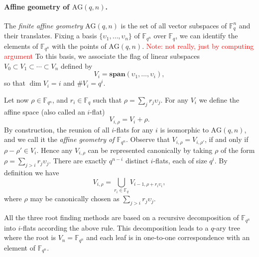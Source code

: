 \documentclass{article}
\newcommand{\ff}[1]{\mathbb{F}_{#1}}
\newcommand{\fq}{\ff{q}}
\newcommand{\qq}{q}
\newcommand{\nn}{n}
\newcommand{\qn}{{\qq^\nn}}
\newcommand{\basef}{\ff{\qq}}
\newcommand{\extf}{\ff{\qn}}
\newcommand{\AG}{\mathrm{AG}(\qq,\nn)}
\newcommand{\Span}{\mathbf{span}}
\newcommand{\card}[1]{\# #1}
\newcommand{\Notes}[1]{\textcolor{red}{Note: #1}}
\begin{document}
\paragraph{Affine geometry of $\AG$.} The \emph{finite affine geometry} $\AG$ is the set of all vector subspaces of $\basef^\nn$ and their translates. Fixing a basis $\{\upsilon_1,\ldots,\upsilon_\nn\}$ of $\extf$ over $\basef$, we can
identify the elements of $\extf$ with the points of $\AG$. \Notes{not really, just by computing argument} To this basis, we associate the flag of linear
subspaces $V_0\subset V_1\subset \cdots \subset V_\nn$ defined by
\begin{equation}
  V_i = \Span(\upsilon_1,\dots,\upsilon_i),
\end{equation}
so that $\dim V_i = i$ and $\card V_i = \qq^i$.

Let now $\rho\in\extf$, and $r_i\in\fq$ such that $\rho=\sum_j r_j\upsilon_j$.  For any
$V_i$ we define the affine space (also called an $i$-flat)
\begin{equation}
  V_{i,\rho} = V_i + \rho.
\end{equation}
By construction, the reunion of all $i$-flats for any $i$ is
isomorphic to $\AG$, and we call it the \emph{affine geometry of
  $\extf$}.
Observe that $V_{i,\rho}=V_{i,\rho'}$, if and only if $\rho-\rho'\in V_i$. Hence
any $V_{i,\rho}$ can be represented canonically by taking $\rho$ of
the form $\rho=\sum_{j>i}r_j\upsilon_j$. There are exactly
$\qq^{n-i}$ distinct $i$-flats, each of size $\qq^i$. By definition we have
\begin{equation}
  \label{decomposition-tree-iflats}
  V_{i,\rho} = \bigcup_{r_i \in\basef} V_{i-1,\rho + r_i \upsilon_i},
\end{equation}
where $\rho$ may be canonically chosen as $\sum_{j>i}r_j\upsilon_j$.

\medskip

\noindent All the three root finding methods are based on a recursive decomposition of $\extf$ into $i$-flats 
according the above rule. This decomposition leads to a $\qq$-ary tree where the root 
is $V_{n}=\extf$ and each leaf is in one-to-one correspondence with an element of $\extf$.

\medskip
\end{document}

